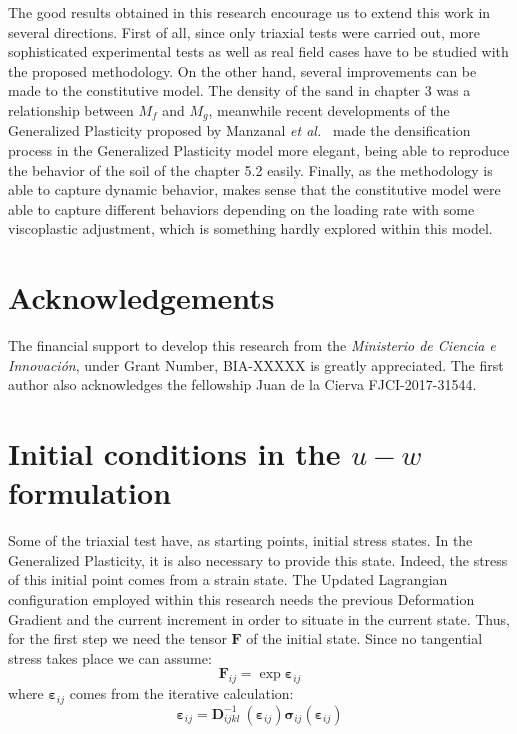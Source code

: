 \documentclass[preprint,12pt,a4paper]{elsarticle}
\begin{document}
The good results obtained in this research encourage us to extend this work in several directions. First of all, since only triaxial tests were carried out, more sophisticated experimental tests as well as real field cases have to be studied with the proposed methodology. On the other hand, several improvements can be made to the constitutive model. The density of the sand in chapter 3 was a relationship between $M_f$ and $M_g$, meanwhile recent developments of the Generalized Plasticity proposed by Manzanal \textit{et al.}~\cite{Manzanal2011,Manzanal2011a} made the densification process in the Generalized Plasticity model more elegant, being able to reproduce the behavior of the soil of the chapter 5.2 easily. Finally, as the methodology is able to capture dynamic behavior, makes sense that the constitutive model were able to capture different behaviors depending on the loading rate with some viscoplastic adjustment, which is something hardly explored within this model. 

\section*{Acknowledgements}
The  financial support to develop this research from the \textit{Ministerio de Ciencia e Innovaci\'on}, under Grant Number, BIA-XXXXX is greatly appreciated. The first author also acknowledges the fellowship Juan de la Cierva FJCI-2017-31544.

\appendix

\clearpage
{}
\section{Initial conditions in the $u-w$ formulation}
\label{ap:1}
Some of the triaxial test have, as starting points, initial stress states. In the Generalized Plasticity, it is also necessary to provide this state. Indeed, the stress of this initial point comes from a strain state. The Updated Lagrangian configuration employed within this research needs the previous Deformation Gradient and the current increment in order to situate in the current state. Thus, for the first step we need the tensor $\boldsymbol{F}$ of the initial state. Since no tangential stress takes place we can assume:
\begin{equation}
    \boldsymbol{F}_{ij}=\exp{\boldsymbol{\varepsilon}_{ij}}
\end{equation}
where $\boldsymbol{\varepsilon}_{ij}$ comes from the iterative calculation:
\begin{equation}
    \boldsymbol{\varepsilon}_{ij}=\boldsymbol{D}^{-1}_{ijkl}\:(\boldsymbol{\varepsilon}_{ij})\boldsymbol{\sigma}_{ij}(\boldsymbol{\varepsilon}_{ij})
\end{equation}
\end{document}
